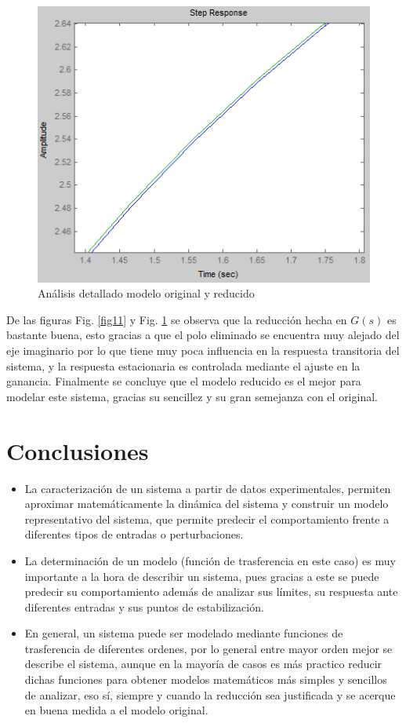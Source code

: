 \documentclass[twocolumn]{IEEEtran}
\begin{document}
\begin{figure}[H]
	\centering
		\includegraphics[scale=0.5]{figure12.png}
	\caption{Análisis detallado modelo original y reducido}
	\label{fig12}
\end{figure}
\noindent
De las figuras Fig. \ref{fig11} y Fig. \ref{fig12} se observa que la reducción hecha en $G(s)$ es bastante buena, esto gracias a que el polo eliminado se encuentra muy alejado del eje imaginario por lo que tiene muy poca influencia en la respuesta transitoria del sistema, y la respuesta estacionaria es controlada mediante el ajuste en la ganancia. Finalmente se concluye que el modelo reducido es el mejor para modelar este sistema, gracias su sencillez y su gran semejanza con el original.

\section{Conclusiones}
\begin{itemize}
 \item La caracterización de un sistema a partir de datos experimentales, permiten aproximar matemáticamente la dinámica del sistema y construir un modelo representativo del sistema, que permite predecir el comportamiento frente a diferentes tipos de entradas o perturbaciones.
 \item La determinación de un modelo (función de trasferencia en este caso) es muy importante a la hora de describir un sistema, pues gracias a este se puede predecir su comportamiento además de analizar sus límites, su respuesta ante diferentes entradas y sus puntos de estabilización.
 \item En general, un sistema puede ser modelado mediante funciones de trasferencia de diferentes ordenes, por lo general entre mayor orden mejor se describe el sistema, aunque en la mayoría de casos es más practico reducir dichas funciones para obtener modelos matemáticos más simples y sencillos de analizar, eso sí, siempre y cuando la reducción sea justificada y se acerque en buena medida a el modelo original.
\end{itemize}
\end{document}
